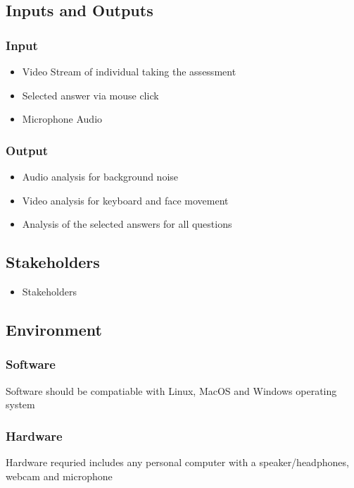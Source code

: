 \documentclass{article}
\begin{document}
\subsection{Inputs and Outputs}
\subsubsection{Input}
\begin{itemize}
\item Video Stream of individual taking the assessment
\item Selected answer via mouse click
\item Microphone Audio 
\end{itemize}
\subsubsection{Output}
\begin{itemize}
\item Audio analysis for background noise 
\item Video analysis for keyboard and face movement
\item Analysis of the selected answers for all questions
\end{itemize}

\subsection{Stakeholders}
\begin{itemize}
    \item Stakeholders
\end{itemize}

\subsection{Environment}
\subsubsection{Software}
Software should be compatiable with Linux, MacOS and Windows operating system
\subsubsection{Hardware}
Hardware requried includes any personal computer with a speaker/headphones, webcam and microphone\\
\end{document}
